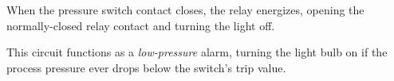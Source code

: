 





When the pressure switch contact closes, the relay energizes, opening the normally-closed relay contact and turning the light off.

\vskip 10pt

This circuit functions as a {\it low-pressure} alarm, turning the light bulb on if the process pressure ever drops below the switch's trip value.




